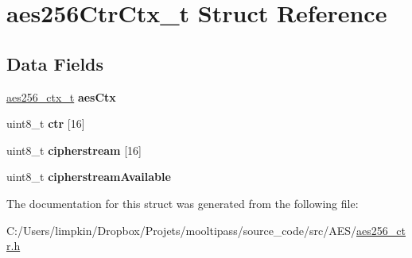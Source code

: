 \hypertarget{structaes256_ctr_ctx__t}{\section{aes256\+Ctr\+Ctx\+\_\+t Struct Reference}
\label{structaes256_ctr_ctx__t}
}
\subsection*{Data Fields}
\begin{DoxyCompactItemize}
\item 
\hypertarget{structaes256_ctr_ctx__t_a534622294f464c237dcab49728a897d4}{\hyperlink{structaes256__ctx__t}{aes256\+\_\+ctx\+\_\+t} {\bfseries aes\+Ctx}}\label{structaes256_ctr_ctx__t_a534622294f464c237dcab49728a897d4}

\item 
\hypertarget{structaes256_ctr_ctx__t_a5ff3a4c9ddefb040b9dabf2f939dd62a}{uint8\+\_\+t {\bfseries ctr} \mbox{[}16\mbox{]}}\label{structaes256_ctr_ctx__t_a5ff3a4c9ddefb040b9dabf2f939dd62a}

\item 
\hypertarget{structaes256_ctr_ctx__t_a0629c0a9d7eb57c8a2da94f78e1d08a4}{uint8\+\_\+t {\bfseries cipherstream} \mbox{[}16\mbox{]}}\label{structaes256_ctr_ctx__t_a0629c0a9d7eb57c8a2da94f78e1d08a4}

\item 
\hypertarget{structaes256_ctr_ctx__t_a37e06e9c77c1b2ee0bfc01d32cda6e38}{uint8\+\_\+t {\bfseries cipherstream\+Available}}\label{structaes256_ctr_ctx__t_a37e06e9c77c1b2ee0bfc01d32cda6e38}

\end{DoxyCompactItemize}


The documentation for this struct was generated from the following file\+:\begin{DoxyCompactItemize}
\item 
C\+:/\+Users/limpkin/\+Dropbox/\+Projets/mooltipass/source\+\_\+code/src/\+A\+E\+S/\hyperlink{aes256__ctr_8h}{aes256\+\_\+ctr.\+h}\end{DoxyCompactItemize}
